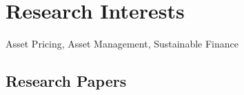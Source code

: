 \documentclass[11pt]{res} %
\renewcommand{\sectionfont}{\bfseries \Large } %
\newcommand{\fullhrulefill}{%
  \vspace{-1ex}%
  \hspace*{-\sectionwidth}\hrulefill%
  }
\begin{document}
\begin{resume}
 
\vspace{0.2in} %


\section{Research Interests}
\fullhrulefill \newline
Asset Pricing, Asset Management, Sustainable Finance%



\vspace{0.2in} %

\begin{etaremune}
\section{Research Papers} 
\vspace{1ex}
\fullline
\vspace{1ex}


\end{etaremune}
\end{resume}
\end{document}

